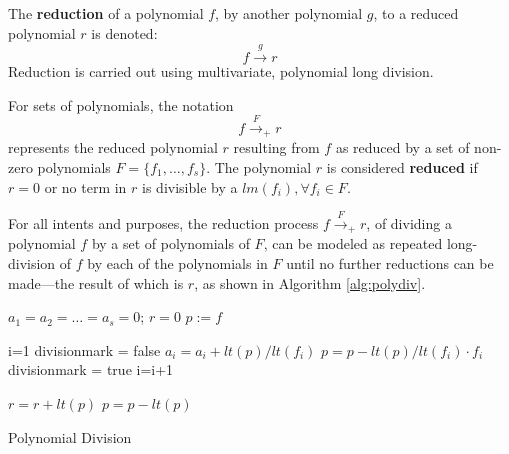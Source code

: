 \begin{Definition}
    The {\bf reduction} of a polynomial $f$, by another polynomial $g$, to
    a reduced polynomial $r$ is denoted:
    \begin{equation*}
        f\stackrel{g}{\textstyle\longrightarrow}r
    \end{equation*}
    Reduction is carried out using multivariate, polynomial long division. 
  
    For sets of polynomials, the notation 
    \begin{equation*}
    f\stackrel{F}{\textstyle\longrightarrow}_+r    
    \end{equation*}
    represents the reduced polynomial $r$ resulting from $f$ as reduced by a 
    set of non-zero polynomials $F = \{f_1,\dots,f_s\}$.  The polynomial $r$ is considered {\bf reduced} if 
    $r = 0$  or no term in $r$ is divisible  by a $lm(f_i), \forall f_i \in F$.
\end{Definition}

  For all intents and purposes, the reduction process
    $f\stackrel{F}{\textstyle\longrightarrow}_+r$, of dividing a 
    polynomial $f$ by a set of polynomials of $F$, can be modeled as
    repeated long-division of $f$ by each of the polynomials in $F$ until no
    further reductions can be made---the result of which is $r$, as shown in Algorithm \ref{alg:polydiv}.

\begin{algorithm}[hbt]
\SetAlgoNoLine

 
 $a_{1}=a_{2}=\dots=a_{s}=0$; $r=0$\;
 $p:=f$\;
 
 {
	i=1\;
	divisionmark = false\;
	{
		{
			$a_{i}=a_{i}+lt(p)/lt(f_{i})$\;
			$p=p-lt(p)/lt(f_{i}) \cdot f_{i}$\;
			divisionmark = true\;
		}
		{
			i=i+1\;
		}
	}
	
	{
		$r=r+lt(p)$\;
		$p=p-lt(p)$\;
	}

 }
\caption{Polynomial Division}\label{alg:polydiv}
\end{algorithm}

